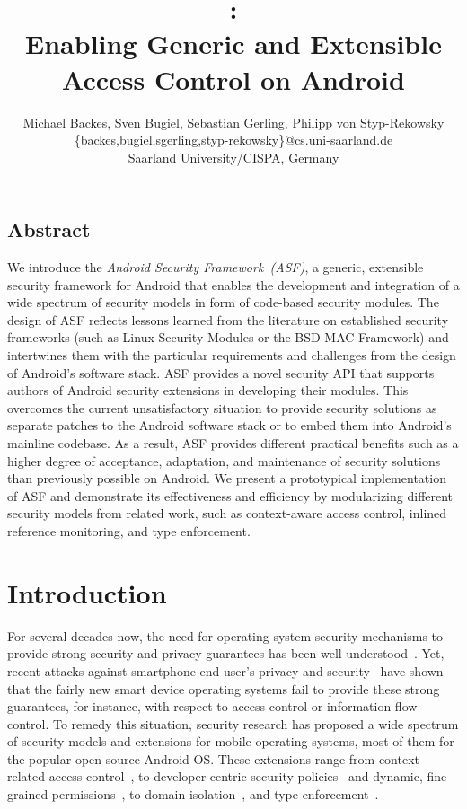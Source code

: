\documentclass[letterpaper,twocolumn,10pt]{article}
\date{}
\title{\OURNAME:\\Enabling Generic and Extensible Access Control on Android}
\author{
 {\rm Michael Backes, Sven Bugiel, Sebastian Gerling, Philipp von Styp-Rekowsky}\\
 \{backes,bugiel,sgerling,styp-rekowsky\}@cs.uni-saarland.de\\
 Saarland University/CISPA, Germany
 }
\newcommand{\OURSHORT}{\textsc{ASF}\xspace}
\begin{document}


\maketitle

\subsection*{Abstract}
We introduce the \emph{Android Security Framework~(ASF)}, a generic, extensible security framework for Android that enables the development and integration of a wide spectrum of security models in form of code-based security modules. The design of \OURSHORT reflects lessons learned from the literature on established security frameworks (such as Linux Security Modules or the BSD MAC Framework) and intertwines them with the particular requirements and challenges from the design of Android's software stack. \OURSHORT provides a novel security API that supports authors of Android security extensions in developing their modules. This overcomes the current unsatisfactory situation to provide security solutions as separate patches to the Android software stack or to embed them into Android's mainline codebase. As a result, \OURSHORT provides different practical benefits such as a higher degree of acceptance, adaptation, and maintenance of security solutions than previously possible on Android. We present a prototypical implementation of \OURSHORT and demonstrate its effectiveness and efficiency by modularizing different security models from related work, such as context-aware access control, inlined reference monitoring, and type enforcement.
 
\section{Introduction}
\label{sect:intro}
For several decades now, the need for operating system security mechanisms to provide strong security and privacy guarantees has been well understood~\cite{Linden:1976:OSS:356678.356682,1451869,Loscocco98theinevitability,Baker:1996:FBU:304851.304886}. Yet, recent attacks against smartphone end-user's privacy and security~\cite{Grace2012,Zhou:2013:NDSS,Zhou:2012:DAM:2310656.2310710,PorterFelt2011,PoWaMoHaCh_11:PermRedeleg,ChPoGrWa_11:AnalyzingInterApp,Felt:2012:APU:2335356.2335360} have shown that the fairly new smart device operating systems fail to provide these strong guarantees, for instance, with respect to access control or information flow control. To remedy this situation, security research has proposed a wide spectrum of security models and extensions for mobile operating systems, most of them for the popular open-source Android OS. These extensions range from context-related access control~\cite{CoNgCr_10:CRePE}, to developer-centric security policies~\cite{OnMcEnMc_09:Saint} and dynamic, fine-grained permissions~\cite{NaKhZh_10:Apex,backes13TACAS,Jeon2012,tissa11}, to domain isolation~\cite{trustdroid,BuDaDm_12:TowardsT}, and type enforcement~\cite{Smalley2013,TUD-CS-2013-0115}.
\end{document}

